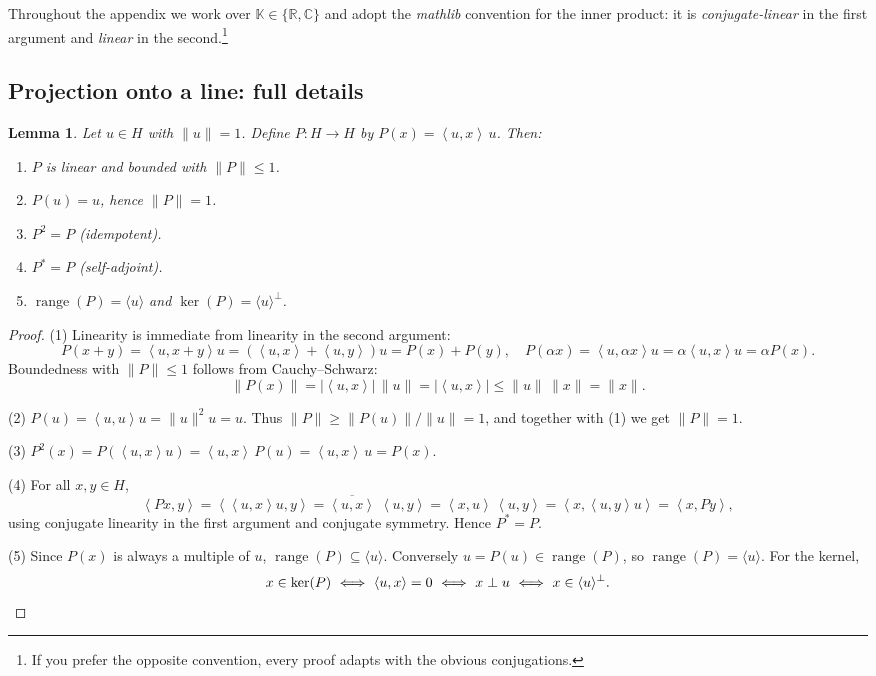 \documentclass[11pt]{article}
\newtheorem{lemma}[theorem]{Lemma}
\theoremstyle{definition}
\newcommand{\K}{\mathbb{K}}
\newcommand{\R}{\mathbb{R}}
\newcommand{\C}{\mathbb{C}}
\newcommand{\ip}[2]{\left\langle #1,#2\right\rangle}
\DeclareMathOperator{\range}{range}
\DeclareMathOperator{\kerop}{ker}
\begin{document}
Throughout the appendix we work over $\K\in\{\R,\C\}$ and adopt the \emph{mathlib} convention for the inner product: it is \emph{conjugate-linear} in the first argument and \emph{linear} in the second.\footnote{If you prefer the opposite convention, every proof adapts with the obvious conjugations.}

\subsection{Projection onto a line: full details}

\begin{lemma}\label{lem:proj-details}
Let $u\in H$ with $\|u\|=1$. Define $P:H\to H$ by $P(x)=\ip{u}{x}\,u$. Then:
\begin{enumerate}
\item $P$ is linear and bounded with $\|P\|\le 1$.
\item $P(u)=u$, hence $\|P\|=1$.
\item $P^2=P$ (idempotent).
\item $P^\ast=P$ (self-adjoint).
\item $\range(P)=\langle u\rangle$ and $\kerop(P)=\langle u\rangle^\perp$.
\end{enumerate}
\end{lemma}

\begin{proof}
(1) Linearity is immediate from linearity in the second argument:
\[
P(x+y)=\ip{u}{x+y}u=(\ip{u}{x}+\ip{u}{y})u=P(x)+P(y),\quad
P(\alpha x)=\ip{u}{\alpha x}u=\alpha\ip{u}{x}u=\alpha P(x).
\]
Boundedness with $\|P\|\le 1$ follows from Cauchy–Schwarz:
\[
\|P(x)\|=\big|\ip{u}{x}\big|\,\|u\|=\big|\ip{u}{x}\big|\le \|u\|\,\|x\|=\|x\|.
\]

(2) $P(u)=\ip{u}{u}u=\|u\|^2 u=u$. Thus $\|P\|\ge \|P(u)\|/\|u\|=1$, and together with (1) we get $\|P\|=1$.

(3) $P^2(x)=P(\ip{u}{x}u)=\ip{u}{x}\,P(u)=\ip{u}{x}\,u=P(x)$.

(4) For all $x,y\in H$,
\[
\ip{P x}{y}=\ip{\ip{u}{x}u}{y}=\overline{\ip{u}{x}}\;\ip{u}{y}
=\ip{x}{u}\,\ip{u}{y}
=\ip{x}{\ip{u}{y}u}=\ip{x}{P y},
\]
using conjugate linearity in the first argument and conjugate symmetry. Hence $P^\ast=P$.

(5) Since $P(x)$ is always a multiple of $u$, $\range(P)\subseteq\langle u\rangle$. Conversely $u=P(u)\in\range(P)$, so $\range(P)=\langle u\rangle$. For the kernel,
\[
x\in \kerop(P)\ \Longleftrightarrow\ \ip{u}{x}=0\ \Longleftrightarrow\ x\perp u
\ \Longleftrightarrow\ x\in \langle u\rangle^\perp.\qedhere
\]
\end{proof}
\end{document}
